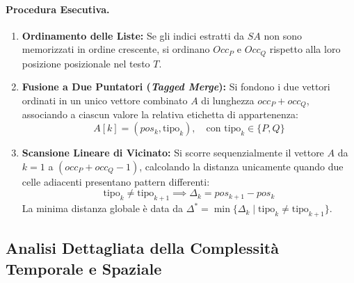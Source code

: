 \paragraph{Procedura Esecutiva.}
\begin{enumerate}
  \item \textbf{Ordinamento delle Liste:} Se gli indici estratti da $SA$ non sono memorizzati in ordine crescente, si ordinano $Occ_P$ e $Occ_Q$ rispetto alla loro posizione posizionale nel testo $T$.
  \item \textbf{Fusione a Due Puntatori (\textit{Tagged Merge}):} Si fondono i due vettori ordinati in un unico vettore combinato $A$ di lunghezza $occ_P + occ_Q$, associando a ciascun valore la relativa etichetta di appartenenza:
  \begin{equation}
    A[k] = (pos_k, \text{tipo}_k), \quad \text{con } \text{tipo}_k \in \{P, Q\}
  \end{equation}
  \item \textbf{Scansione Lineare di Vicinato:} Si scorre sequenzialmente il vettore $A$ da $k = 1$ a $(occ_P + occ_Q - 1)$, calcolando la distanza unicamente quando due celle adiacenti presentano pattern differenti:
  \begin{equation}
    \text{tipo}_k \neq \text{tipo}_{k+1} \implies \Delta_k = pos_{k+1} - pos_k
  \end{equation}
  La minima distanza globale \`e data da $\Delta^* = \min \{ \Delta_k \mid \text{tipo}_k \neq \text{tipo}_{k+1} \}$.
\end{enumerate}

\FloatBarrier
\subsection{Analisi Dettagliata della Complessità Temporale e Spaziale}
\label{subsec:complessita-closest-occurrences}

